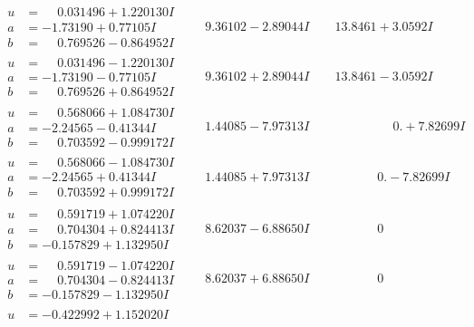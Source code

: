 \documentclass[1p]{elsarticle_modified}
\theoremstyle{definition}
\begin{document}
$$\begin{array}{c|c|c}
\begin{aligned}
u &= \phantom{-}0.031496 + 1.220130 I \\
a &= -1.73190 + 0.77105 I \\
b &= \phantom{-}0.769526 - 0.864952 I\end{aligned}
 & \phantom{-}9.36102 - 2.89044 I & \phantom{-}13.8461 + 3.0592 I \\ \hline\begin{aligned}
u &= \phantom{-}0.031496 - 1.220130 I \\
a &= -1.73190 - 0.77105 I \\
b &= \phantom{-}0.769526 + 0.864952 I\end{aligned}
 & \phantom{-}9.36102 + 2.89044 I & \phantom{-}13.8461 - 3.0592 I \\ \hline\begin{aligned}
u &= \phantom{-}0.568066 + 1.084730 I \\
a &= -2.24565 - 0.41344 I \\
b &= \phantom{-}0.703592 - 0.999172 I\end{aligned}
 & \phantom{-}1.44085 - 7.97313 I & \phantom{-0.000000 -}0. + 7.82699 I \\ \hline\begin{aligned}
u &= \phantom{-}0.568066 - 1.084730 I \\
a &= -2.24565 + 0.41344 I \\
b &= \phantom{-}0.703592 + 0.999172 I\end{aligned}
 & \phantom{-}1.44085 + 7.97313 I & \phantom{-0.000000 } 0. - 7.82699 I \\ \hline\begin{aligned}
u &= \phantom{-}0.591719 + 1.074220 I \\
a &= \phantom{-}0.704304 + 0.824413 I \\
b &= -0.157829 + 1.132950 I\end{aligned}
 & \phantom{-}8.62037 - 6.88650 I & \phantom{-0.000000 } 0 \\ \hline\begin{aligned}
u &= \phantom{-}0.591719 - 1.074220 I \\
a &= \phantom{-}0.704304 - 0.824413 I \\
b &= -0.157829 - 1.132950 I\end{aligned}
 & \phantom{-}8.62037 + 6.88650 I & \phantom{-0.000000 } 0 \\ \hline\begin{aligned}
u &= -0.422992 + 1.152020 I \\

\end{aligned}
\end{array}$$
\end{document}
